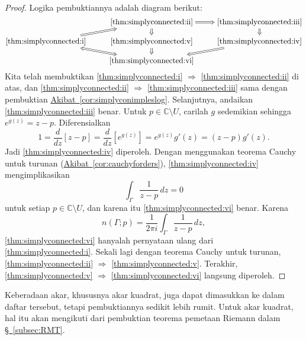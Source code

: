 \documentclass[12pt,openany]{book}
\newcommand{\C}{{\mathbb{C}}}
\theoremstyle{plain}
\theoremstyle{remark}
\theoremstyle{definition}
\theoremstyle{exercise}
\theoremstyle{example}
\newcommand{\subsectionref}[1]{\hyperref[#1]{\S~\ref*{#1}}}
\newcommand{\corref}[1]{\hyperref[#1]{Akibat~\ref*{#1}}}
\begin{document}
\begin{proof}
Logika pembuktiannya adalah diagram berikut:
\begin{equation*}
\begin{tikzcd}[cramped, row sep=small]
& \text{\ref{thm:simplyconnected:ii}} \arrow[d, Rightarrow] \arrow[r, Rightarrow] &
\text{\ref{thm:simplyconnected:iii}} \arrow[d, Rightarrow] \\
\text{\ref{thm:simplyconnected:i}} \arrow[ur, Rightarrow] & 
\text{\ref{thm:simplyconnected:v}} \arrow[d, Rightarrow] &
\text{\ref{thm:simplyconnected:iv}} \arrow[dl, Rightarrow] \\
& \text{\ref{thm:simplyconnected:vi}} \arrow[ul, Leftrightarrow] &
\end{tikzcd}
\end{equation*}
Kita telah membuktikan
\ref{thm:simplyconnected:i} $\Rightarrow$
\ref{thm:simplyconnected:ii} di atas,
dan
\ref{thm:simplyconnected:ii} $\Rightarrow$
\ref{thm:simplyconnected:iii}
sama dengan pembuktian \corref{cor:simplyconimpleslog}.
Selanjutnya, andaikan \ref{thm:simplyconnected:iii} benar. Untuk
$p \in \C \setminus U$, carilah $g$ sedemikian sehingga
$e^{g(z)} = z-p$.
Diferensialkan
\begin{equation*}
1 = 
\frac{d}{dz} \left[
z-p
\right]
=
\frac{d}{dz} \left[
e^{g(z)}
\right]
=
e^{g(z)} g'(z)
=
(z-p) g'(z) .
\end{equation*}
Jadi \ref{thm:simplyconnected:iv} diperoleh.
Dengan menggunakan teorema Cauchy untuk turunan (\corref{cor:cauchyforders}),
\ref{thm:simplyconnected:iv} mengimplikasikan
\begin{equation*}
\int_\Gamma \frac{1}{z-p} \, dz = 0 
\end{equation*}
untuk setiap $p \in \C \setminus U$,
dan karena itu 
\ref{thm:simplyconnected:vi} benar.
Karena 
\begin{equation*}
n(\Gamma;p) = 
\frac{1}{2\pi i}
\int_\Gamma \frac{1}{z-p} \, dz ,
\end{equation*}
\ref{thm:simplyconnected:vi} hanyalah pernyataan ulang dari
\ref{thm:simplyconnected:i}.
Sekali lagi dengan teorema Cauchy untuk turunan,
\ref{thm:simplyconnected:ii} $\Rightarrow$
\ref{thm:simplyconnected:v}.
Terakhir, \ref{thm:simplyconnected:v} $\Rightarrow$
\ref{thm:simplyconnected:vi} langsung diperoleh.
\end{proof}

Keberadaan akar, khususnya akar kuadrat, juga dapat dimasukkan ke dalam
daftar tersebut, tetapi pembuktiannya sedikit lebih rumit. Untuk akar kuadrat, hal itu akan
mengikuti dari pembuktian teorema pemetaan Riemann dalam 
\subsectionref{subsec:RMT}.
\end{document}
